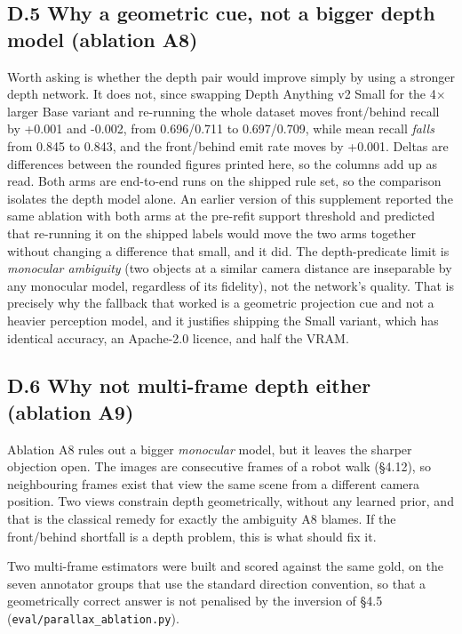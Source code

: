 \subsection{D.5 Why a geometric cue, not a bigger depth model (ablation A8)}

Worth asking is whether the depth pair would improve simply by using a stronger depth network. It does not, since swapping Depth Anything v2 Small for the 4$\times$ larger Base variant and re-running the whole dataset moves front/behind recall by +0.001 and -0.002, from 0.696/0.711 to 0.697/0.709, while mean recall \textit{falls} from 0.845 to 0.843, and the front/behind emit rate moves by +0.001. Deltas are differences between the rounded figures printed here, so the columns add up as read. Both arms are end-to-end runs on the shipped rule set, so the comparison isolates the depth model alone. An earlier version of this supplement reported the same ablation with both arms at the pre-refit support threshold and predicted that re-running it on the shipped labels would move the two arms together without changing a difference that small, and it did. The depth-predicate limit is \textit{monocular ambiguity} (two objects at a similar camera distance are inseparable by any monocular model, regardless of its fidelity), not the network's quality. That is precisely why the fallback that worked is a geometric projection cue and not a heavier perception model, and it justifies shipping the Small variant, which has identical accuracy, an Apache-2.0 licence, and half the VRAM.

\subsection{D.6 Why not multi-frame depth either (ablation A9)}

Ablation A8 rules out a bigger \textit{monocular} model, but it leaves the sharper objection open. The images are consecutive frames of a robot walk (\S{}4.12), so neighbouring frames exist that view the same scene from a different camera position. Two views constrain depth geometrically, without any learned prior, and that is the classical remedy for exactly the ambiguity A8 blames. If the front/behind shortfall is a depth problem, this is what should fix it.

Two multi-frame estimators were built and scored against the same gold, on the seven annotator groups that use the standard direction convention, so that a geometrically correct answer is not penalised by the inversion of \S{}4.5 (\texttt{eval/parallax\_\allowbreak{}ablation.py}).

